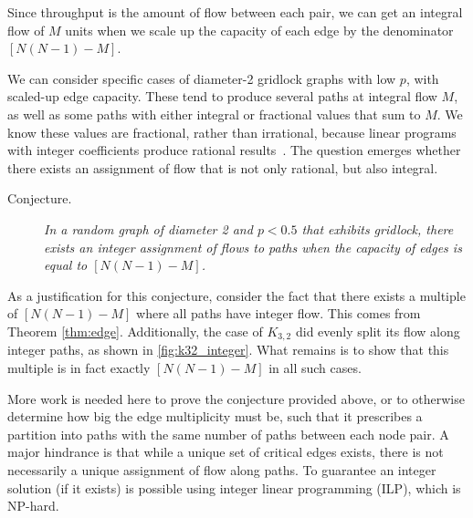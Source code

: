 Since throughput is the amount of flow between each pair, we can get an integral flow of $M$ units when we scale up the capacity of each edge by the denominator $[N(N-1)-M]$. 

We can consider specific cases of diameter-2 gridlock graphs with low $p$, with scaled-up edge capacity. These tend to produce several paths at integral flow $M$, as well as some paths with either integral or  fractional values that sum to $M$. We know these values are fractional, rather than irrational, because linear programs with integer coefficients produce rational results~\cite{adler1992polynomial}. The question emerges whether there exists an assignment of flow that is not only rational, but also integral.

\begin{description}
\item[Conjecture.] \emph{In a random graph of diameter 2 and $p<0.5$ that exhibits gridlock, there exists an integer assignment of flows to paths when the capacity of edges is equal to $[N ( N - 1 ) - M ]$.}
\end{description}

As a justification for this conjecture, consider the fact that there exists a multiple of $[N ( N - 1 ) - M ]$ where all paths have integer flow. This comes from Theorem \autoref{thm:edge}. Additionally, the case of $K_{3,2}$ did evenly split its flow along integer paths, as shown in \autoref{fig:k32_integer}. What remains is to show that this multiple is in fact exactly $[N ( N - 1 ) - M ]$ in all such cases.

More work is needed here to prove the conjecture provided above, or to otherwise determine how big the edge multiplicity must be, such that it prescribes a partition into paths with the same number of paths between each node pair. A major hindrance is that while a unique set of critical edges exists, there is not necessarily a unique assignment of flow along paths. To guarantee an integer solution (if it exists) is possible using integer linear programming (ILP), which is NP-hard.

